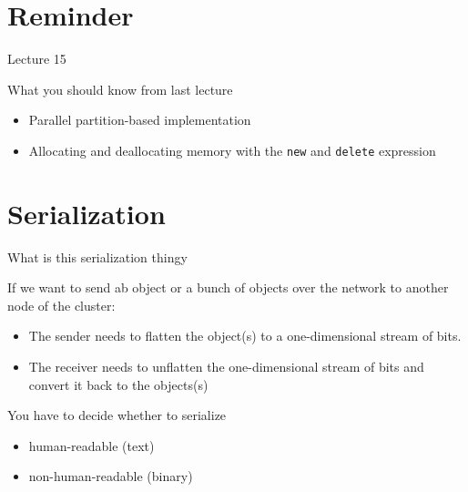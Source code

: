 \documentclass[12pt,t]{beamer}
\title{\coursename}
\subtitle{Lecture 16: Preparation for distributed computing }
\date {
 \tiny \url{\courseurl}
\vspace{2cm}
\doclicenseThis  
  
}
\begin{document}
 {
    \frame {
        \titlepage
    }
}

\frame{

\tableofcontents

}


\section{Reminder}
\begin{frame}{Lecture 15}
\begin{block}{What you should know from last lecture}
\begin{itemize}
\item Parallel partition-based implementation
\item Allocating and deallocating memory with the \lstinline|new| and \lstinline|delete| expression
\end{itemize}
\end{block}
\end{frame}

\section{Serialization}

\begin{frame}{What is this serialization thingy}

If we want to send ab object or a bunch of objects over the network to another node of the cluster:

\begin{itemize}
\item The sender needs to flatten the object(s) to a one-dimensional stream of bits.
\item The receiver needs to unflatten the one-dimensional stream of bits and convert it back to the objects(s)
\end{itemize}

You have to decide whether to serialize
\begin{itemize}
\item human-readable (text)
\item non-human-readable (binary)
\end{itemize}
\end{frame}
\end{document}
